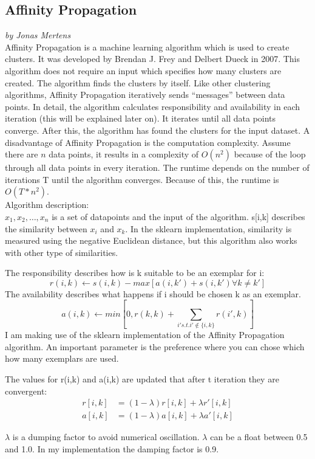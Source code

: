 \subsection{Affinity Propagation}
\textit{by Jonas Mertens}\\
	
Affinity Propagation is a machine learning algorithm which is used to create clusters. It was developed by Brendan J. Frey and Delbert Dueck in 2007. This algorithm does not require an input which specifies how many clusters are created. The algorithm finds the clusters by itself. Like other clustering algorithms, Affinity Propagation iteratively sends “messages” between data points. In detail, the algorithm calculates responsibility and availability in each iteration (this will be explained later on). It iterates until all data points converge. After this, the algorithm has found the clusters for the input dataset. A disadvantage of Affinity Propagation is the computation complexity. Assume there are $n$ data points, it results in a complexity of $O(n^2)$ because of the loop through all data points in every iteration. The runtime depends on the number of iterations T until the algorithm converges. Because of this, the runtime is $O(T* n^2)$.\\ 
Algorithm description: \\
$x_1, x_2 , \dots,  x_n$ is a set of datapoints and the input of the algorithm. s[i,k] describes the similarity between $x_i$ and $x_k$. In the \gls{sklearn} implementation, similarity is measured using the negative Euclidean distance, but this algorithm also works with other type of similarities. 

The responsibility describes how is k suitable to be an exemplar for i:
\begin{equation}
r(i,k) \leftarrow  s(i,k) - max \left [ a(i,k') + s(i, k') \forall k \neq k' \right ]
\end{equation}
The availability describes what happens if i should be chosen k as an exemplar. 
\begin{equation}
a(i,k) \leftarrow  min \left [ 0, r(k,k) +  \sum_{i' s.t. i'\notin \{i,k\}} r(i',k) \right ]
\end{equation}
I am making use of the \gls{sklearn} implementation of the Affinity Propagation algorithm. An important parameter is the preference where you can chose which how many exemplars are used. 
	
The values for r(i,k) and a(i,k) are updated that after t iteration they are convergent:
\begin{align}
r \left [ i,k \right ] &= (1-\lambda)r \left [ i,k \right ] + \lambda r' \left [ i,k \right ]\\
a \left [ i,k \right ] &= (1-\lambda)a \left [ i,k \right ] + \lambda a' \left [ i,k \right ]  
\end{align}
	
$\lambda$ is a dumping factor to avoid numerical oscillation. $\lambda$ can be a float between 0.5 and 1.0. In my implementation the damping factor is 0.9. 
	
	